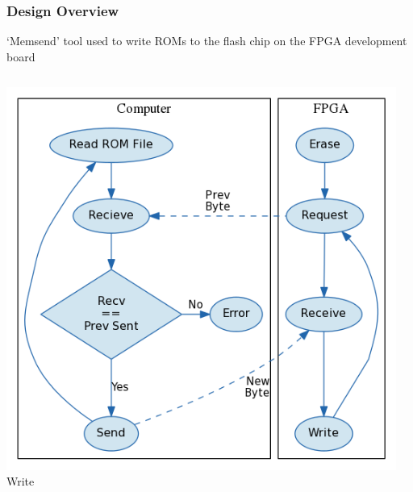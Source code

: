 \documentclass[xcolor=table]{beamer}
\begin{document}
\begin{frame}
    \frametitle{Design Overview}
    \begin{center}
        `Memsend' tool used to write ROMs to the flash chip on the FPGA development board
    \end{center}
    \begin{columns}[c]
        \begin{center}
            \includegraphics[width=\textwidth]{../../fpga/rom_flasher/doc/block_diagram_write.png} \\
            Write
        \end{center}
        \begin{center}

\end{center}
\end{columns}
\end{frame}
\end{document}
